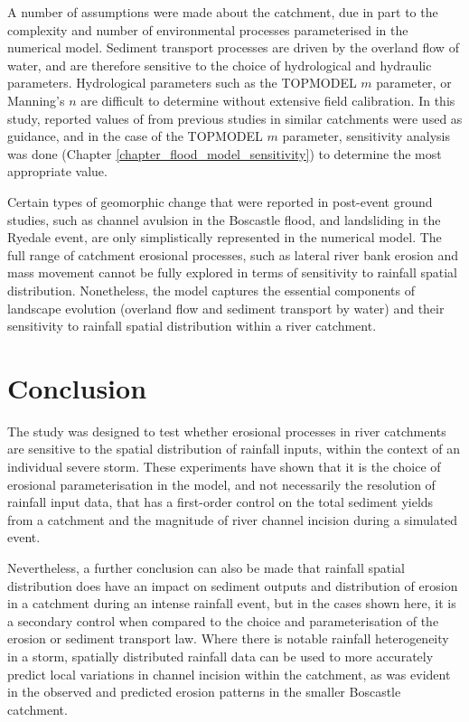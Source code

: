 A number of assumptions were made about the catchment, due in part to the complexity and number of environmental processes parameterised in the numerical model. Sediment transport processes are driven by the overland flow of water, and are therefore sensitive to the choice of hydrological and hydraulic parameters. Hydrological parameters such as the TOPMODEL \(m\) parameter, or Manning's \(n\) are difficult to determine without extensive field calibration. In this study, reported values of from previous studies in similar catchments were used as guidance, and in the case of the TOPMODEL \(m\) parameter, sensitivity analysis was done (Chapter \ref{chapter_flood_model_sensitivity}) to determine the most appropriate value.   

Certain types of geomorphic change that were reported in post-event ground studies, such as channel avulsion in the Boscastle flood, and landsliding in the Ryedale event, are only simplistically represented in the numerical model. The full range of catchment erosional processes, such as lateral river bank erosion and mass movement cannot be fully explored in terms of sensitivity to rainfall spatial distribution. Nonetheless, the model captures the essential components of landscape evolution (overland flow and sediment transport by water) and their sensitivity to rainfall spatial distribution within a river catchment.


                       
\section{Conclusion}
The study was designed to test whether erosional processes in river catchments are sensitive to the spatial distribution of rainfall inputs, within the context of an individual severe storm.
These experiments have shown that it is the choice of erosional parameterisation in the model, and not necessarily the resolution of rainfall input data, that has a first-order control on the total sediment yields from a catchment and the magnitude of river channel incision during a simulated event.

Nevertheless, a further conclusion can also be made that rainfall spatial distribution does have an impact on sediment outputs and distribution of erosion in a catchment during an intense rainfall event, but in the cases shown here, it is a secondary control when compared to the choice and parameterisation of the erosion or sediment transport law. Where there is notable rainfall heterogeneity in a storm, spatially distributed rainfall data can be used to more accurately predict local variations in channel incision within the catchment, as was evident in the observed and predicted erosion patterns in the smaller Boscastle catchment.

